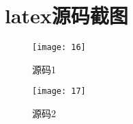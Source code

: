 \documentclass[lang=cn,11pt]{elegantpaper}
\begin{document}
\section{latex源码截图}

\begin{figure}[htbp]
	\centering
	\texttt{[image: 16]}
	\caption{源码1 \label{fig:15}}
\end{figure}

\begin{figure}[htbp]
	\centering
	\texttt{[image: 17]}
	\caption{源码2 \label{fig:16}}
\end{figure}

%
%
\end{document}

